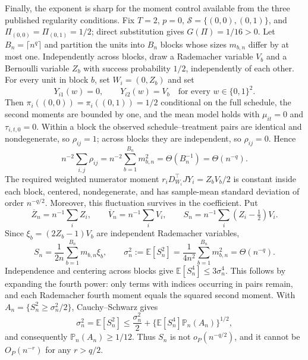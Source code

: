 Finally, the exponent is sharp for the moment control available from the three published regularity conditions. Fix \(T=2\), \(p=0\), \(\mathcal S=\{(0,0),(0,1)\}\), and \(\Pi_{(0,0)}=\Pi_{(0,1)}=1/2\); direct substitution gives \(G(\Pi)=1/16>0\). Let \(B_n=\lceil n^q\rceil\) and partition the units into \(B_n\) blocks whose sizes \(m_{b,n}\) differ by at most one. Independently across blocks, draw a Rademacher variable \(V_b\) and a Bernoulli variable \(Z_b\) with success probability \(1/2\), independently of each other. For every unit in block \(b\), set \(W_i=(0,Z_b)\) and set
\[
Y_{i1}(w)=0,\qquad Y_{i2}(w)=V_b
\quad\text{for every }w\in\{0,1\}^2.
\]
Then \(\pi_i((0,0))=\pi_i((0,1))=1/2\) conditional on the full schedule, the second moments are bounded by one, and the mean model holds with \(\mu_{it}=0\) and \(\tau_{i,t,0}=0\). Within a block the observed schedule--treatment pairs are identical and nondegenerate, so \(\rho_{ij}=1\); across blocks they are independent, so \(\rho_{ij}=0\). Hence
\[
n^{-2}\sum_{i,j}\rho_{ij}
=n^{-2}\sum_{b=1}^{B_n}m_{b,n}^2
=\Theta(B_n^{-1})=\Theta(n^{-q}).
\]
The required weighted numerator moment
\(r_iD_{W_i}^{\top}JY_i=Z_bV_b/2\) is constant inside each block, centered, nondegenerate, and has sample-mean standard deviation of order \(n^{-q/2}\). Moreover, this fluctuation survives in the coefficient. Put
\[
\overline Z_n=n^{-1}\sum_iZ_i,\qquad
\overline V_n=n^{-1}\sum_iV_i,\qquad
S_n=n^{-1}\sum_i(Z_i-\tfrac12)V_i.
\]
Since \(\xi_b=(2Z_b-1)V_b\) are independent Rademacher variables,
\[
S_n=\frac{1}{2n}\sum_{b=1}^{B_n}m_{b,n}\xi_b,
\qquad
\sigma_n^2:=\mathbb E[S_n^2]
=\frac{1}{4n^2}\sum_{b=1}^{B_n}m_{b,n}^2
=\Theta(n^{-q}).
\]
Independence and centering across blocks give
\(\mathbb E[S_n^4]\leq3\sigma_n^4\). This follows by expanding the fourth power: only terms with indices occurring in pairs remain, and each Rademacher fourth moment equals the squared second moment. With
\(A_n=\{S_n^2\geq\sigma_n^2/2\}\), Cauchy--Schwarz gives
\[
\sigma_n^2=\mathbb E[S_n^2]
\leq \frac{\sigma_n^2}{2}
  +\{\mathbb E[S_n^4]\mathbb P_n(A_n)\}^{1/2},
\]
and consequently \(\mathbb P_n(A_n)\geq1/12\). Thus
\(S_n\) is not \(o_P(n^{-q/2})\), and it cannot be \(O_P(n^{-r})\) for any \(r>q/2\).

